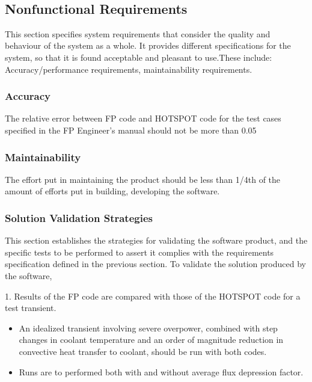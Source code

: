 ~\newline
\subsection{Nonfunctional Requirements}

This section specifies system requirements that consider the quality and
behaviour of the system as a whole. It provides different specifications for the
system, so that it is found acceptable and pleasant to use.These include:
Accuracy/performance requirements, maintainability requirements.

\subsubsection{Accuracy}

The relative error between FP code and HOTSPOT code for the test cases specified
in the FP Engineer's manual should not be more than 0.05 ~\newline

\subsubsection{Maintainability}

The effort put in maintaining the product should be less than 1/4th of the
amount of efforts put in building, developing the software.  ~\newline

\subsubsection{Solution Validation Strategies}

This section establishes the strategies for validating the software product, and
the specific tests to be performed to assert it complies with the requirements
specification defined in the previous section. To validate the solution produced
by the software,

1. Results of the FP code are compared with those of the HOTSPOT code for a test
transient.

\begin{itemize}

\item An idealized transient involving severe overpower, combined with step
  changes in coolant temperature and an order of magnitude reduction in
  convective heat transfer to coolant, should be run with both codes.
\item Runs are to performed both with and without average flux depression
  factor.
\end{itemize}

